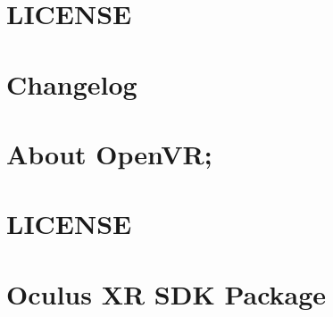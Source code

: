 \let\mypdfximage\pdfximage\def\pdfximage{\immediate\mypdfximage}\documentclass[twoside]{book}
\newcommand{\+}{\discretionary{\mbox{\scriptsize$\hookleftarrow$}}{}{}}
\begin{document}
\chapter{L\+I\+C\+E\+N\+SE}
\label{md__o_1__git_h_u_b_m_i_n_i_p_roject__library__package_cache_com_8unity_8textmeshpro_0D1_83_80__l_i_c_e_n_s_e}

\chapter{Changelog}
\label{md__o_1__git_h_u_b_m_i_n_i_p_roject__library__package_cache_com_8unity_8xr_8openvr_8standalone_0D1_80_80__c_h_a_n_g_e_l_o_g}

\chapter{About Open\+VR;}
\label{md__o_1__git_h_u_b_m_i_n_i_p_roject__library__package_cache_com_8unity_8xr_8openvr_8standalone_082d9307a69615b474ffc41f4e3818ef6}

\chapter{L\+I\+C\+E\+N\+SE}
\label{md__o_1__git_h_u_b_m_i_n_i_p_roject__library__package_cache_com_8unity_8xr_8openvr_8standalone_0D1_80_80__l_i_c_e_n_s_e}

\chapter{Oculus XR S\+DK Package}
\label{md__o_1__git_h_u_b_m_i_n_i_p_roject__library__package_cache_com_8unity_8xr_8openvr_8standalone_0D1_80_80__r_e_a_d_m_e}

\end{document}
